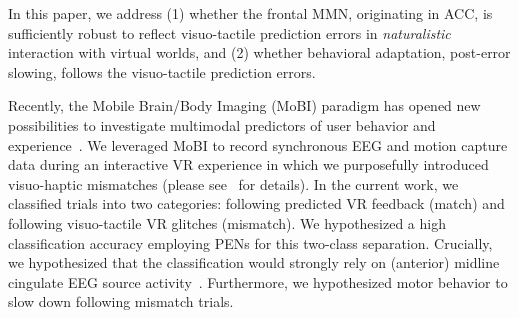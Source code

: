 In this paper, we address (1) whether the frontal MMN, originating in ACC, is sufficiently robust to reflect visuo-tactile prediction errors in \textit{naturalistic} interaction with virtual worlds, and (2) whether behavioral adaptation, post-error slowing, follows the visuo-tactile prediction errors.

Recently, the Mobile Brain/Body Imaging (MoBI) paradigm has opened new possibilities to investigate multimodal predictors of user behavior and experience~\cite{Makeig2009-je, Gramann2011-fr, Gramann2014-qo, Jungnickel2019-mv}. We leveraged MoBI to record synchronous EEG and motion capture data during an interactive VR experience in which we purposefully introduced visuo-haptic mismatches (please see~\cite{Gehrke2019-og} for details). In the current work, we classified trials into two categories: following predicted VR feedback (match) and following visuo-tactile VR glitches (mismatch). We hypothesized a high classification accuracy employing PENs for this two-class separation. Crucially, we hypothesized that the classification would strongly rely on (anterior) midline cingulate EEG source activity~\cite{Zander2016-ed, Tollner2017-rm}. Furthermore, we hypothesized motor behavior to slow down following mismatch trials.













